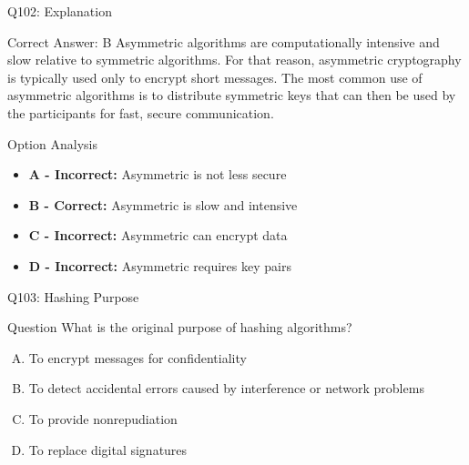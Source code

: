 \documentclass{beamer}
\begin{document}
	\begin{frame}{Q102: Explanation}
		\begin{block}{Correct Answer: B}
			Asymmetric algorithms are computationally intensive and slow relative to symmetric algorithms. For that reason, asymmetric cryptography is typically used only to encrypt short messages. The most common use of asymmetric algorithms is to distribute symmetric keys that can then be used by the participants for fast, secure communication.
		\end{block}
		\begin{block}{Option Analysis}
			\begin{itemize}
				\item \textbf{A - Incorrect:} Asymmetric is not less secure
				\item \textbf{B - Correct:} Asymmetric is slow and intensive
				\item \textbf{C - Incorrect:} Asymmetric can encrypt data
				\item \textbf{D - Incorrect:} Asymmetric requires key pairs
			\end{itemize}
		\end{block}
	\end{frame}
	
	\begin{frame}{Q103: Hashing Purpose}
		\begin{block}{Question}
			What is the original purpose of hashing algorithms?
		\end{block}
		\begin{enumerate}[(A)]
			\item To encrypt messages for confidentiality
			\item To detect accidental errors caused by interference or network problems
			\item To provide nonrepudiation
			\item To replace digital signatures
		\end{enumerate}
	\end{frame}
	
\end{document}

